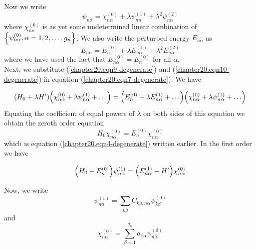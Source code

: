 	Now we write
	\begin{equation}
		\psi_{n \alpha} = \chi_{n\alpha}^{(0)} + \lambda \psi_{n \alpha}^{(1)} + \lambda^2 \psi_{n \alpha}^{(2)}
		\label{chapter20.eqn9-degenerate} 
	\end{equation}
	where $\chi_{n\alpha}^{(0)}$ is as yet some undetermined linear combination of $\qty{\psi_{n \alpha}^{(0)}, \alpha=1,2,\ldots,g_n}$. We also write the perturbed energy $E_{n\alpha}$ as 
	\begin{equation}
		E_{n\alpha} = E_n^{(0)} + \lambda E_{n\alpha}^{(1)} + \lambda^2 E_{n\alpha}^{(2)}
		\label{chapter20.eqn10-degenerate}
	\end{equation}
	where we have used the fact that $E_{n\alpha}^{(0)} = E_n^{(0)}$ for all $\alpha$.\\
	
	Next, we substitute (\ref{chapter20.eqn9-degenerate}) and (\ref{chapter20.eqn10-degenerate}) in equation (\ref{chapter20.eqn7-degenerate}). We have

	\begin{equation}
		\qty(H_0 + \lambda H^\prime) \qty(\chi_{n\alpha}^{(0)} + \lambda \psi_{n \alpha}^{(1)} + \ldots) 
		= \qty(E_n^{(0)} + \lambda E_{n\alpha}^{(1)} + \ldots) \qty(\chi_{n\alpha}^{(0)} + \lambda \psi_{n \alpha}^{(1)} + \ldots) 
	\end{equation}
	Equating the coefficient of equal powers of $\lambda$ on both sides of this equation we obtain the zeroth order equation
	\begin{equation}
		H_0 \chi_{n\alpha}^{(0)} = E_n^{(0)} \chi_{n\alpha}^{(0)}
	\end{equation}
	which is equation (\ref{chapter20.eqn4-degenerate}) written earlier. In the first order we have
	
	
	
	\begin{equation}
		\qty(H_0 - E_n^{(0)}) \psi_{n \alpha}^{(1)} = \qty(E_{n\alpha}^{(1)} - H^\prime) \chi_{n\alpha}^{(0)}
		\label{chapter20.eqn11-degenerate}
	\end{equation}
	
	Now, we write
	\begin{equation}
		\psi_{n \alpha}^{(1)} = \sum_{k\beta} C_{k\beta, n\alpha} \psi_{k \beta}^{(0)}
		\label{chapter20.eqn12-degenerate}
	\end{equation}
	and
	\begin{equation}
		\chi_{n\alpha}^{(0)} = \sum_{\beta=1}^{g_n} a_{\beta\alpha} \psi_{n\beta}^{(0)}
		\label{chapter20.eqn13-degenerate}
	\end{equation}
	
